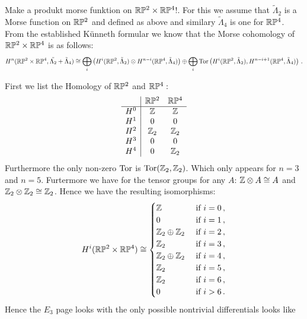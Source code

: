 	\begin{example}
		Make a produkt morse funktion on $\mathbb{R}\mathbb{P}^2\times \mathbb{R}\mathbb{P}^4$!. 
		For this we assume that $\tilde{\Lambda}_2$ is a Morse function on $\mathbb{R}\mathbb{P}^2$ and defined as above and similary $\tilde{\Lambda}_4$ is one for $\mathbb{R}\mathbb{P}^4$.
		From the established Künneth formular we know that the Morse cohomology of $\mathbb{R}\mathbb{P}^2 \times \mathbb{R}\mathbb{P}^4$ is as follows: 
		\begin{equation*}
			H^n(\mathbb{R}\mathbb{P}^2\times \mathbb{R}\mathbb{P}^4,\tilde{\Lambda_2}+\tilde{\Lambda}_4)\cong \bigoplus_i\left(
			H^i(\mathbb{R}\mathbb{P}^2,\tilde{\Lambda}_2)\otimes H^{n-i} (\mathbb{R}\mathbb{P}^4,\tilde{\Lambda}_4)
			\right) \oplus \bigoplus_i \operatorname{\mathrm{Tor}}\left(
			H^i(\mathbb{R}\mathbb{P}^2,\tilde{\Lambda}_2),
			 H^{n-i+1} (\mathbb{R}\mathbb{P}^4,\tilde{\Lambda}_4)
			\right)\,.
		\end{equation*}
		
		First we list the Homology of $\mathbb{R}\mathbb{P}^2$ and $\mathbb{R}\mathbb{P}^4:$
	\begin{equation*}
		\begin{array}{c|c c}
			& \mathbb{R}\mathbb{P}^2 &\mathbb{R}\mathbb{P}^4\\
			\hline
			H^0&\mathbb{Z}&\mathbb{Z} \\
			H^1&0&0\\
			H^2&\mathbb{Z}_2&\mathbb{Z}_2\\
			H^3&0&0\\
			H^4&0&\mathbb{Z}_2
		\end{array}
	\end{equation*}
 Furthermore the only non-zero $\operatorname{\mathrm{Tor}}$ is $\operatorname{\mathrm{Tor}}(\mathbb{Z}_2,\mathbb{Z}_2)$. Which only appears for $n=3$ and $n=5$. Furtermore we have for the tensor groups for any $A$: $\mathbb{Z}\otimes A\cong A$ and $\mathbb{Z}_2\otimes \mathbb{Z}_2 \cong \mathbb{Z}_2$.  Hence we have the resulting isomorphisms: 
 \begin{equation*}
 	H^i(\mathbb{R}\mathbb{P}^2\times \mathbb{R}\mathbb{P}^4)\cong \begin{cases}
 		\mathbb{Z} & \text{ if }i=  0\,,\\
	 	0  & \text{ if }i=  1\,,\\
	 	\mathbb{Z}_2\oplus \mathbb{Z}_2& \text{ if }i= 2\,,\\
	 	\mathbb{Z}_2 & \text{ if }i=  3\,,\\
	 	\mathbb{Z}_2\oplus \mathbb{Z}_2 & \text{ if }i=  4\,,\\
	 	\mathbb{Z}_2& \text{ if }i=  5\,,\\
	 	\mathbb{Z}_2& \text{ if }i=  6\,,\\
	 	0& \text{ if }i>6\,.
 	\end{cases}
 \end{equation*}
 Hence the $E_3$ page looks with the only possible nontrivial differentials looks like
 \begin{center}

\end{center}
\end{example}
